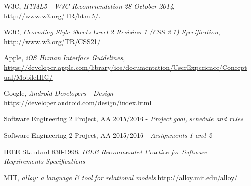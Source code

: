 \begin{thebibliography}{1}
  W3C,
  \emph{HTML5 - W3C Recommendation 28 October 2014}, \url{http://www.w3.org/TR/html5/}.

  W3C,
  \emph{Cascading Style Sheets Level 2 Revision 1 (CSS 2.1) Specification}, \url{http://www.w3.org/TR/CSS21/}

	Apple,
	\emph{iOS Human Interface Guidelines}, \url{https://developer.apple.com/library/ios/documentation/UserExperience/Conceptual/MobileHIG/}

	Google,
	\emph{Android Developers - Design}
	\url{https://developer.android.com/design/index.html}

	Software Engineering 2 Project, AA 2015/2016 - \emph{Project goal, schedule and rules}

	Software Engineering 2 Project, AA 2015/2016 - \emph{Assignments 1 and 2}

	IEEE Standard 830-1998: \emph{IEEE Recommended Practice for Software Requirements Specifications}

    MIT, \emph{alloy: a language \& tool for relational models} \url{http://alloy.mit.edu/alloy/}

\end{thebibliography}
